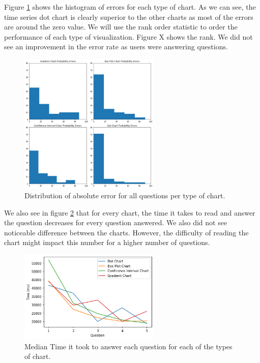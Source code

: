\documentclass[a4paper,3p,sort&compress]{elsarticle}
\begin{document}
Figure \ref{figure:errors} shows the histogram of errors for each type of chart. As we can see, the time series dot chart is clearly superior to the other charts as most of the errors are around the zero value. We will use the rank order statistic to order the performance of each type of visualization. Figure X shows the rank. We did not see an improvement in the error rate as users were answering questions.

\begin{figure}
  \centering
  \includegraphics[width=0.6\textwidth]{probability_errors}
  \caption{\label{figure:errors}Distribution of absolute error for all questions per type of chart.}
\end{figure}

We also see in figure \ref{figure:duration} that for every chart, the time it takes to read and answer the question decreases for every question answered. We also did not see noticeable difference between the charts. However, the difficulty of reading the chart might impact this number for a higher number of questions.

\begin{figure}
  \centering
   \includegraphics[width=0.6\textwidth]{duration_evo}
  \caption{\label{figure:duration} Median Time it took to answer each question for each of the types of chart.}
\end{figure}  
\end{document}
